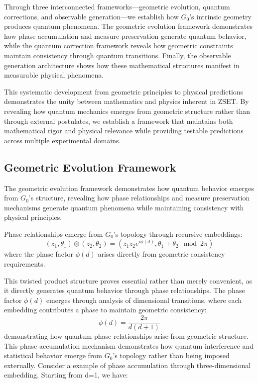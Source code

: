 \documentclass[10pt]{article}
\begin{document}
Through three interconnected frameworks—geometric evolution, quantum corrections, and observable generation—we establish how $G_0$'s intrinsic geometry produces quantum phenomena. The geometric evolution framework demonstrates how phase accumulation and measure preservation generate quantum behavior, while the quantum correction framework reveals how geometric constraints maintain consistency through quantum transitions. Finally, the observable generation architecture shows how these mathematical structures manifest in measurable physical phenomena.

This systematic development from geometric principles to physical predictions demonstrates the unity between mathematics and physics inherent in ZSET. By revealing how quantum mechanics emerges from geometric structure rather than through external postulates, we establish a framework that maintains both mathematical rigor and physical relevance while providing testable predictions across multiple experimental domains.

\subsection{Geometric Evolution Framework}

The geometric evolution framework demonstrates how quantum behavior emerges from $G_0$'s structure, revealing how phase relationships and measure preservation mechanisms generate quantum phenomena while maintaining consistency with physical principles.

Phase relationships emerge from $G_0$'s topology through recursive embeddings:
\[
(z_1, \theta_1) \otimes (z_2, \theta_2) = \left(z_1z_2e^{i\phi(d)}, \theta_1 + \theta_2 \mod 2\pi\right)
\]
where the phase factor $\phi(d)$ arises directly from geometric consistency requirements.

This twisted product structure proves essential rather than merely convenient, as it directly generates quantum behavior through phase relationships. The phase factor $\phi(d)$ emerges through analysis of dimensional transitions, where each embedding contributes a phase to maintain geometric consistency:
\[
\phi(d) = \frac{2\pi}{d(d+1)}
\]
demonstrating how quantum phase relationships arise from geometric structure. This phase accumulation mechanism demonstrates how quantum interference and statistical behavior emerge from $G_0$'s topology rather than being imposed externally. Consider a example of phase accumulation through three-dimensional embedding. Starting from d=1, we have:
\end{document}
